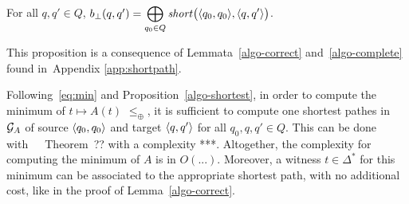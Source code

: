 \begin{proposition}\label{algo-shortest}
For all $q, q' \in Q$, 
$b_\bot(q, q') = \displaystyle\bigoplus_{q_0 \in Q} \mathit{short}\bigl(\< q_0, q_0>, \< q, q'>\bigr)$.
\end{proposition}
This proposition is a consequence of Lemmata~\ref{algo-correct} and~\ref{algo-complete} found in~Appendix \ref{app:shortpath}.

\medskip\noindent
Following~\eqref{eq:min} and Proposition~\ref{algo-shortest}, 
in order to compute the minimum of $t \mapsto A(t)$ \wrt $\leq_\oplus$, 
it is sufficient to compute one shortest pathes in $\mathcal{G}_{A}$ of source
$\<q_0, q_0>$ and target $\<q, q'>$ for all $q_0, q, q' \in Q$.
This can be done with~~\cite{Mohri02semiring}~Theorem~?? 
with a complexity ***. Altogether, the complexity for computing the minimum of $A$
is in $O(...)$.
Moreover, a witness $t \in \Delta^*$ for this minimum can be associated to the appropriate
shortest path, with no additional cost, like in the proof of Lemma~\ref{algo-correct}.






